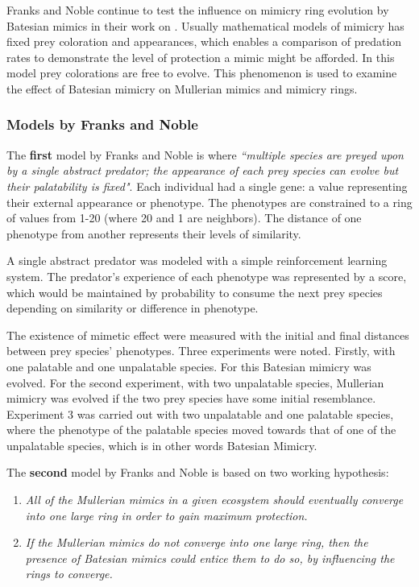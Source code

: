 \documentclass[letterpaper]{article}
\numberwithin{equation}{section}
\begin{document}
Franks and Noble continue to test the influence on mimicry ring evolution by Batesian mimics in their work on \cite{franks2004}. Usually mathematical models of mimicry has fixed prey coloration and appearances, which enables a comparison of predation rates to demonstrate the level of protection a mimic might be afforded. In this model prey colorations are free to evolve. This phenomenon is used to examine the effect of Batesian mimicry on Mullerian mimics and mimicry rings. 

\subsubsection{Models by Franks and Noble}
\label{subsec:models-by-frank-and-noble}
The \textbf{first} model by Franks and Noble \cite{franks2002} is where \textsl{``multiple species are preyed upon by a single abstract predator; the appearance of each prey species can evolve but their palatability is fixed"}. Each individual had a single gene: a value representing their external appearance or phenotype. The phenotypes are constrained to a ring of values from 1-20 (where 20 and 1 are neighbors). The distance of one phenotype from another represents their levels of similarity. 

A single abstract predator was modeled with a simple reinforcement learning system. The predator's experience of each phenotype was represented by a score, which would be maintained by probability to consume the next prey species depending on similarity or difference in phenotype. 

The existence of mimetic effect were measured with the initial and final distances between prey species' phenotypes. Three experiments were noted. Firstly, with one palatable and one unpalatable species. For this Batesian mimicry was evolved. For the second experiment, with two unpalatable species, Mullerian mimicry was evolved if the two prey species have some initial resemblance. Experiment 3 was carried out with two unpalatable and one palatable species, where the phenotype of the palatable species moved towards that of one of the unpalatable species, which is in other words Batesian Mimicry.

The \textbf{second} model by Franks and Noble \cite{franks2003} is based on two working hypothesis:

\begin{enumerate}
	\item \textsl{All of the Mullerian mimics in a given ecosystem should eventually converge into one large ring in order to gain maximum protection.}
	\item \textsl{If the Mullerian mimics do not converge into one large ring, then the presence of Batesian mimics could entice them to do so, by influencing the rings to converge.}
\end{enumerate}
\end{document}
